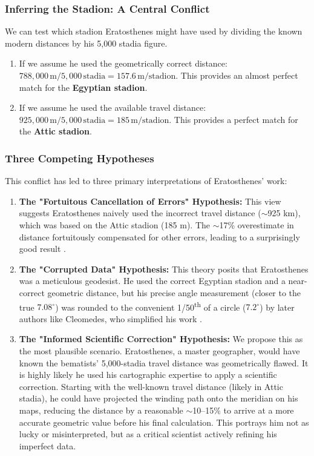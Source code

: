 \documentclass[11pt]{article}
\begin{document}
\subsubsection{Inferring the Stadion: A Central Conflict}
We can test which stadion Eratosthenes might have used by dividing the known modern distances by his 5,000 stadia figure.
\begin{enumerate}
    \item  If we assume he used the geometrically correct distance:  
    $788,000 \, \text{m} / 5,000 \, \text{stadia} = 157.6 \, \text{m/stadion}$.  
    This provides an almost perfect match for the \textbf{Egyptian stadion}.
    \item  If we assume he used the available travel distance:  
    $925,000 \, \text{m} / 5,000 \, \text{stadia} = 185 \, \text{m/stadion}$.  
    This provides a perfect match for the \textbf{Attic stadion}.
\end{enumerate}

\subsubsection{Three Competing Hypotheses}
This conflict has led to three primary interpretations of Eratosthenes' work:
\begin{enumerate}
    \item \textbf{The "Fortuitous Cancellation of Errors" Hypothesis:} This view suggests Eratosthenes naively used the incorrect travel distance ($\sim$925 km), which was based on the Attic stadion (185 m). The $\sim$17\% overestimate in distance fortuitously compensated for other errors, leading to a surprisingly good result \cite{Dutka1993}.
    \item \textbf{The "Corrupted Data" Hypothesis:} This theory posits that Eratosthenes was a meticulous geodesist. He used the correct Egyptian stadion and a near-correct geometric distance, but his precise angle measurement (closer to the true $7.08^{\circ}$) was rounded to the convenient 1/50\textsuperscript{th} of a circle ($7.2^{\circ}$) by later authors like Cleomedes, who simplified his work \cite{Rawlins1982}.
    \item \textbf{The "Informed Scientific Correction" Hypothesis:} We propose this as the most plausible scenario. Eratosthenes, a master geographer, would have known the bematists' 5,000-stadia travel distance was geometrically flawed. It is highly likely he used his cartographic expertise to apply a scientific correction. Starting with the well-known travel distance (likely in Attic stadia), he could have projected the winding path onto the meridian on his maps, reducing the distance by a reasonable $\sim$10--15\% to arrive at a more accurate geometric value before his final calculation. This portrays him not as lucky or misinterpreted, but as a critical scientist actively refining his imperfect data.
\end{enumerate}
\end{document}
